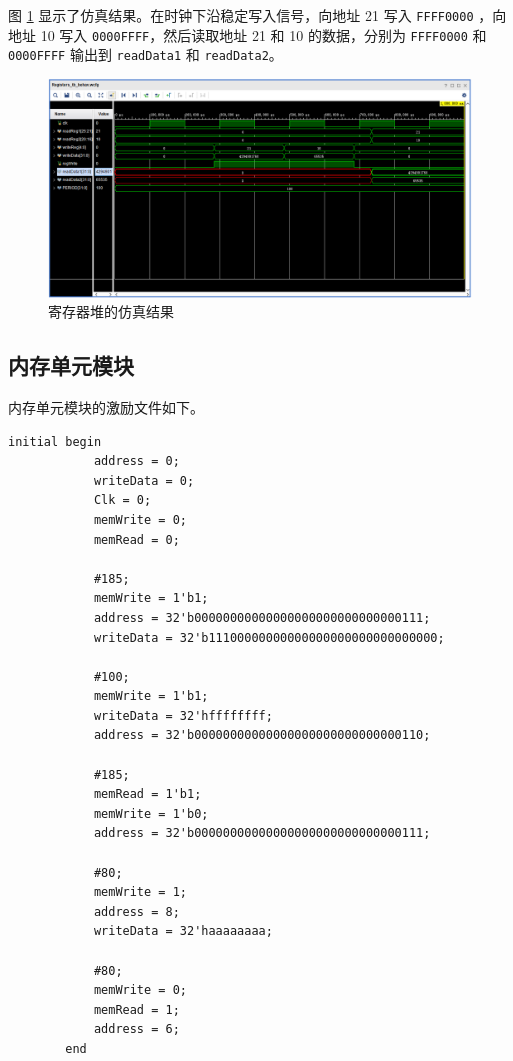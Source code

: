 \documentclass[a4paper,UTF8]{ctexart}
\begin{document}
图 \ref{fig:regs} 显示了仿真结果。在时钟下沿稳定写入信号，向地址 21 写入 \verb"FFFF0000" ，向地址 10 写入 \verb"0000FFFF"，然后读取地址 21 和 10 的数据，分别为 \verb"FFFF0000" 和 \verb"0000FFFF" 输出到 \verb"readData1" 和 \verb"readData2"。

\begin{figure}[h]
    \centering
    \includegraphics[width=\textwidth]{figure1.png}
    \caption{寄存器堆的仿真结果}
    \label{fig:regs}
\end{figure}

\subsection{内存单元模块}

内存单元模块的激励文件如下。
    \begin{lstlisting}[caption=dataMemory\_tb.v,basicstyle=\ttfamily\scriptsize]
        initial begin
            address = 0;
            writeData = 0;
            Clk = 0;
            memWrite = 0;
            memRead = 0;
    
            #185;
            memWrite = 1'b1;
            address = 32'b00000000000000000000000000000111;
            writeData = 32'b11100000000000000000000000000000;
    
            #100;
            memWrite = 1'b1;
            writeData = 32'hffffffff;
            address = 32'b00000000000000000000000000000110;
    
            #185;
            memRead = 1'b1;
            memWrite = 1'b0;
            address = 32'b00000000000000000000000000000111;
    
            #80;
            memWrite = 1;
            address = 8;
            writeData = 32'haaaaaaaa;
    
            #80;
            memWrite = 0;
            memRead = 1;
            address = 6;
        end
    \end{lstlisting} 
\end{document}
